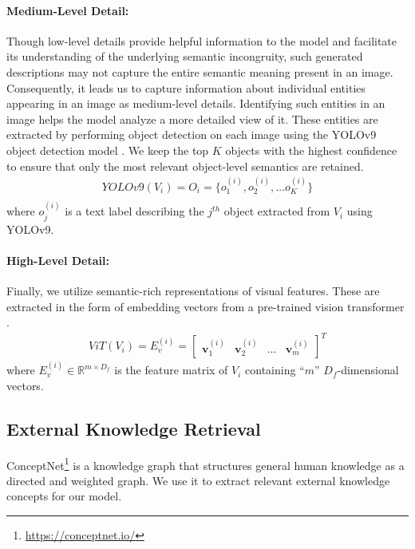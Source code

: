 \paragraph{Medium-Level Detail:} Though low-level details provide helpful information to the model and facilitate its understanding of the underlying semantic incongruity, such generated descriptions may not capture the entire semantic meaning present in an image. Consequently, it leads us to capture information about individual entities appearing in an image as medium-level details. Identifying such entities in an image helps the model analyze a more detailed view of it. These entities are extracted by performing object detection on each image using the YOLOv9 object detection model \cite{wang2024yolov9}. We keep the top $K$ objects with the highest confidence to ensure that only the most relevant object-level semantics are retained.
\begin{equation}
    \label{eq: medium-grained-semantics}
    \begin{aligned}
        YOLOv9(V_i) = O_i = \{o_1^{(i)}, o_2^{(i)}, \dots o_K^{(i)}\}\\
    \end{aligned}
\end{equation}
where $o_j^{(i)}$ is a text label describing the $j^{th}$ object extracted from $V_i$ using YOLOv9. 

\paragraph{High-Level Detail:} Finally, we utilize semantic-rich representations of visual features. These are extracted in the form of embedding vectors from a pre-trained vision transformer \cite{dosovitskiy2021image}.
\begin{equation}
    \label{eq: fine-grained-semantics}
    \begin{aligned}
        ViT(V_i) = E_v^{(i)} =
        \begin{bmatrix}
            \textbf{v}_1^{(i)} & \textbf{v}_2^{(i)} & \dots & \textbf{v}_m^{(i)}
        \end{bmatrix}^T
    \end{aligned}
\end{equation}
where $E_v^{(i)} \in \mathbb{R}^{m \times D_f}$ is the feature matrix of $V_i$ containing ``$m$'' $D_f$-dimensional vectors.
\subsection{External Knowledge Retrieval}
ConceptNet\footnote{\url{https://conceptnet.io/}} \cite{speer2017conceptnet} is a knowledge graph that structures general human knowledge as a directed and weighted graph. We use it to extract relevant external knowledge concepts for our model. 

